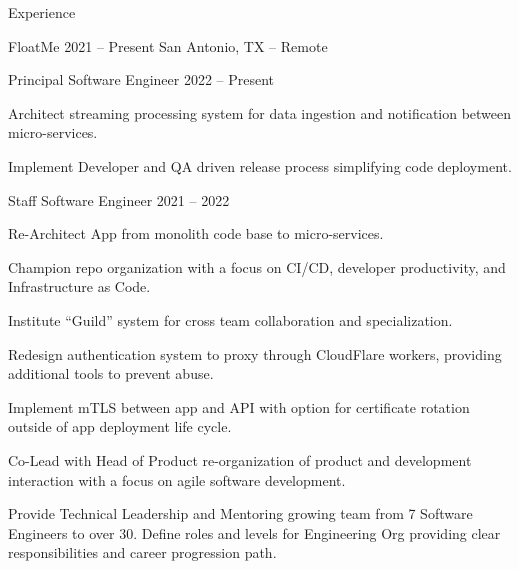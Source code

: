 \documentclass{resume}
\begin{document}
    \begin{rSection}{Experience}

        \begin{rSubsection}{FloatMe}
            {2021 -- Present} %
            {San Antonio, TX -- Remote} %
            \begin{rSubsubsection}{Principal Software Engineer} %
                {2022 -- Present} %
            \item Architect streaming processing system for data ingestion
                and notification between micro-services.
            \item Implement Developer and QA driven release process simplifying
                code deployment.
            \end{rSubsubsection}
            \begin{rSubsubsection}{Staff Software Engineer} %
                {2021 -- 2022} %
            \item Re-Architect App from monolith code base to micro-services.
            \item Champion repo organization with a focus on CI/CD, developer
                productivity, and Infrastructure as Code.
            \item Institute ``Guild'' system for cross team collaboration and
                specialization.
            \item Redesign authentication system to proxy through CloudFlare
                workers, providing additional tools to prevent abuse.
            \item Implement mTLS between app and API with option for
                certificate rotation outside of app deployment life cycle.
            \item Co-Lead with Head of Product re-organization of product
                and development interaction with a focus on agile software
                development.
            \item Provide Technical Leadership and Mentoring growing team from
                7 Software Engineers to over 30. Define roles and levels for
                Engineering Org providing clear responsibilities and career
                progression path.
            \end{rSubsubsection}
        \end{rSubsection}


\end{rSection}
\end{document}
